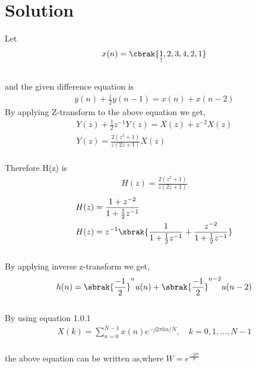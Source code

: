 \documentclass[journal,12pt,twocolumn]{IEEEtran}
\begin{document}
\section{Solution}
Let
\begin{align}
    x(n) = \cbrak{\underset{\uparrow}{1},2,3,4,2,1} 
\end{align}\\
and the given difference equation is \\
\begin{align}
    y(n) + \frac{1}{2}y(n-1) = x(n) + x(n-2)
\end{align}
By applying Z-transform to the above equation we get, \\
\begin{align}
Y(z) + \frac{1}{2}z^{-1}Y(z)=X(z) + z^{-2}X(z)\\
Y(z)=\frac{2(z^2+1)}{z(2z+1)}X(z)
\end{align}\\
Therefore H(z) is \\
\begin{align}
H(z) = \frac{2(z^2+1)}{z(2z+1)} 
\end{align}
\begin{align}
H(z) &= \frac{1+z^{-2}}{1+\frac{1}{2}z^{-1}}\\
H(z) &= z^{-1}\sbrak{\frac{1}{1+\frac{1}{2}z^{-1}} + \frac{z^{-2}}{1+\frac{1}{2}z^{-1}}}
\end{align}\\
By applying inverse z-transform we get,\\
\begin{align}
    h(n)=\sbrak{\frac{-1}{2}}^nu(n) + \sbrak{\frac{-1}{2}}^{n-2}u(n-2)
\end{align}\\
By using equation 1.0.1 \\
\begin{align}
    X(k) = \sum_{n=0}^{N-1} x(n) e^{-j 2 \pi k n / N}, \quad k=0,1, \ldots, N-1
\end{align}\\
the above equation can be written as,where  $W = e^{\frac{-j2\pi}{N}}$ \\
\end{document}
